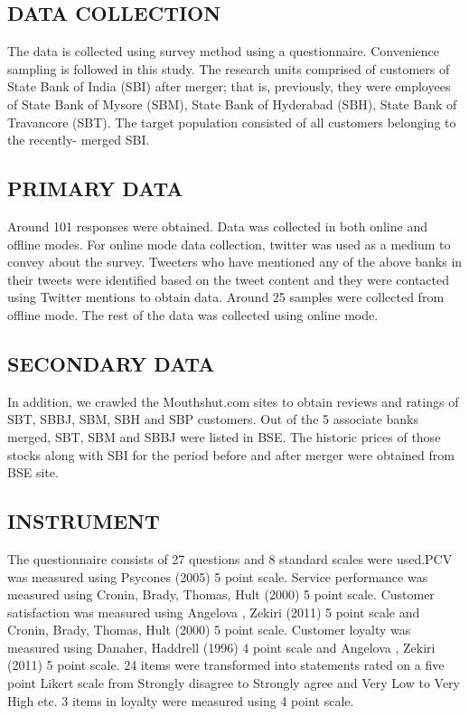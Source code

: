 \documentclass[a4paper, 12pt]{extarticle}
\begin{document}
{\subsection{DATA COLLECTION}
\par The data is collected using survey method using a questionnaire. Convenience sampling is followed in this study. The research units comprised of customers of State Bank of India (SBI) after merger; that is, previously, they were employees of State Bank of Mysore (SBM), State Bank of Hyderabad (SBH), State Bank of Travancore (SBT). The target population consisted of all customers belonging to the recently- merged SBI. 
\subsection{PRIMARY DATA}
\par Around 101 responses were obtained. Data was collected in both online and offline modes. For online mode data collection, twitter was used as a medium to convey about the survey. Tweeters who have mentioned any of the above banks in their tweets were identified based on the tweet content and they were contacted using Twitter mentions to obtain data. Around 25 samples were collected from offline mode. The rest of the data was collected using online mode.
\subsection{SECONDARY DATA}
In addition, we crawled the Mouthshut.com sites to obtain reviews and ratings of SBT, SBBJ, SBM, SBH and SBP customers. Out of the 5 associate banks merged, SBT, SBM and SBBJ were listed in BSE. The historic prices of those stocks along with SBI for the period before and after merger were obtained from BSE site.

\subsection{INSTRUMENT}
The questionnaire consists of 27 questions and 8 standard scales were used.PCV was measured using Psycones (2005)  5 point scale. Service performance was measured using Cronin, Brady, Thomas, Hult (2000)  5 point scale. Customer satisfaction was measured using 
Angelova , Zekiri (2011)  5 point scale and Cronin, Brady, Thomas, Hult (2000)  5 point scale. Customer loyalty was measured using Danaher, Haddrell (1996) 4 point scale and Angelova , Zekiri (2011) 5 point scale. 24 items were transformed into statements rated on a five  point Likert scale from Strongly disagree to Strongly agree and Very Low to Very High etc. 3 items in loyalty were measured using 4 point scale.

}
\end{document}
